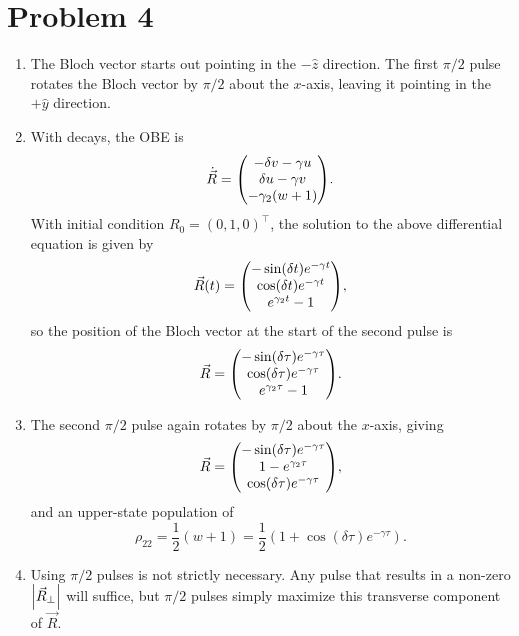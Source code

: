 \documentclass[12pt]{article}
\begin{document}
\section*{Problem 4}
\begin{enumerate}[label=(\alph*)]
	\item The Bloch vector starts out pointing in the $-\hat{z}$ direction. The first $\pi/2$ pulse rotates the Bloch vector by $\pi/2$ about the $x$-axis, leaving it pointing in the $+\hat{y}$ direction.
	\item With decays, the OBE is
	\[ \dot{\vec{R}} = \mqty(-\delta v-\gamma u\\\delta u - \gamma v\\-\gamma_2(w+1)). \]
	With initial condition $R_0 = (0,1,0)^\intercal$, the solution to the above differential equation is given by
	\[ \vec{R}(t) = \mqty(-\sin(\delta t)e^{-\gamma t}\\\cos(\delta t)e^{-\gamma t}\\e^{\gamma_2t}-1), \]
	so the position of the Bloch vector at the start of the second pulse is
	\[ \vec{R} = \mqty(-\sin(\delta \tau)e^{-\gamma \tau}\\\cos(\delta \tau)e^{-\gamma \tau}\\e^{\gamma_2\tau}-1). \]
	\item The second $\pi/2$ pulse again rotates by $\pi/2$ about the $x$-axis, giving
	\[ \vec{R} = \mqty(-\sin(\delta \tau)e^{-\gamma \tau}\\1-e^{\gamma_2\tau}\\\cos(\delta \tau)e^{-\gamma \tau}), \]
	and an upper-state population of
	\[ \rho_22 = \frac{1}{2}(w+1) = \frac{1}{2}(1 + \cos(\delta\tau)e^{-\gamma\tau}). \]
	\item Using $\pi/2$ pulses is not strictly necessary. Any pulse that results in a non-zero $\abs{\vec{R}_\perp}$ will suffice, but $\pi/2$ pulses simply maximize this transverse component of $\vec{R}$.
\end{enumerate}


\end{document}
